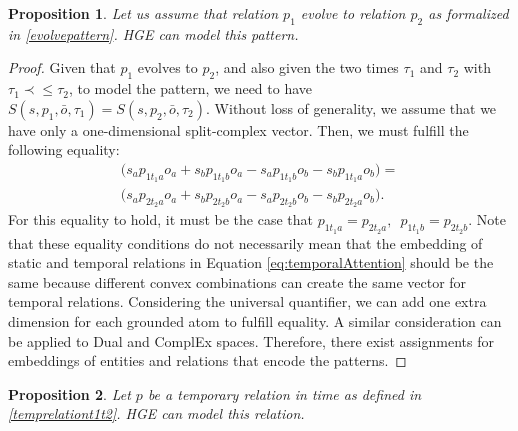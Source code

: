 \documentclass[letterpaper]{article} %
\newtheorem{proposition}{Proposition}
\begin{document}
\begin{proposition}
Let us assume that relation $p_1$ evolve to relation $p_2$ as formalized in \ref{evolvepattern}. HGE can model this pattern.
\label{th1:tempevolv}
\end{proposition}
\begin{proof}
Given that $p_1$ evolves to $p_2$, and also given 
the two times $\tau_1$ and $\tau_2$ with $\tau_1 \prec\leq \tau_2$,
to model the pattern, we need to have $S(s,p_1,\bar{o},\tau_1) =  S(s,p_2,\bar{o},\tau_2).$
Without loss of generality, we assume that we have only a one-dimensional split-complex vector. Then, we must fulfill the following equality:
\begin{align*}
    \big( s_a p_{1t_1a} o_{a} + s_b p_{1t_1b} o_{a} - s_a p_{1t_1b} o_{b} - s_b p_{1t_1a} o_{b}\big) =  \\
    \big( s_a p_{2t_2a} o_{a} + s_b p_{2t_2b} o_{a} - s_a p_{2t_2b} o_{b} - s_b p_{2t_2a} o_{b}\big).
\end{align*}
For this equality to hold, it must be the case that  $p_{1t_1a} = p_{2t_2a},\,\,\, p_{1t_1b} = p_{2t_2b}$. Note that these equality conditions do not necessarily mean that the embedding of static and temporal relations in Equation \ref{eq:temporalAttention} should be the same because different convex combinations can create the same vector for temporal relations. Considering the  universal quantifier, we can add one extra dimension for each grounded atom to fulfill equality. 
A similar consideration can be applied to Dual and ComplEx spaces. Therefore, there exist assignments for embeddings of entities and relations that encode the patterns.
\end{proof}

\begin{proposition}
Let $p$ be a temporary relation in time as defined in \ref{temprelationt1t2}. HGE can model this relation.
\label{th1:tempevolv}
\end{proposition}
\end{document}
